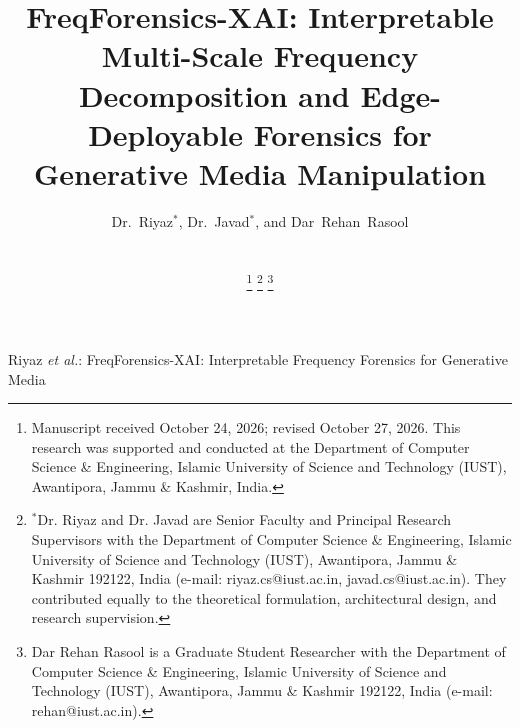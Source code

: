 \documentclass[journal]{IEEEtran}
\begin{document}
\title{FreqForensics-XAI: Interpretable Multi-Scale Frequency Decomposition and Edge-Deployable Forensics for Generative Media Manipulation}

\author{
    Dr.~Riyaz$^{*}$,
    Dr.~Javad$^{*}$, and
    Dar~Rehan~Rasool\\
    \\
    \\
    \thanks{Manuscript received October 24, 2026; revised October 27, 2026. This research was supported and conducted at the Department of Computer Science \& Engineering, Islamic University of Science and Technology (IUST), Awantipora, Jammu \& Kashmir, India.}%
    \thanks{$^{*}$Dr. Riyaz and Dr. Javad are Senior Faculty and Principal Research Supervisors with the Department of Computer Science \& Engineering, Islamic University of Science and Technology (IUST), Awantipora, Jammu \& Kashmir 192122, India (e-mail: riyaz.cs@iust.ac.in, javad.cs@iust.ac.in). They contributed equally to the theoretical formulation, architectural design, and research supervision.}%
    \thanks{Dar Rehan Rasool is a Graduate Student Researcher with the Department of Computer Science \& Engineering, Islamic University of Science and Technology (IUST), Awantipora, Jammu \& Kashmir 192122, India (e-mail: rehan@iust.ac.in).}%
}

%
{Riyaz \MakeLowercase{\textit{et al.}}: FreqForensics-XAI: Interpretable Frequency Forensics for Generative Media}

\maketitle
\end{document}
